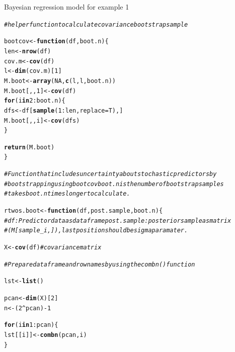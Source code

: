 \documentclass[11pt,a4paper,twoside]{book}\usepackage[]{graphicx}\usepackage[]{color}
\makeatletter
\newcommand{\hlnum}[1]{\textcolor[rgb]{0.686,0.059,0.569}{#1}}%
\newcommand{\hlcom}[1]{\textcolor[rgb]{0.678,0.584,0.686}{\textit{#1}}}%
\newcommand{\hlopt}[1]{\textcolor[rgb]{0,0,0}{#1}}%
\newcommand{\hlstd}[1]{\textcolor[rgb]{0.345,0.345,0.345}{#1}}%
\newcommand{\hlkwa}[1]{\textcolor[rgb]{0.161,0.373,0.58}{\textbf{#1}}}%
\newcommand{\hlkwb}[1]{\textcolor[rgb]{0.69,0.353,0.396}{#1}}%
\newcommand{\hlkwc}[1]{\textcolor[rgb]{0.333,0.667,0.333}{#1}}%
\newcommand{\hlkwd}[1]{\textcolor[rgb]{0.737,0.353,0.396}{\textbf{#1}}}%
\newenvironment{kframe}{%
 \def\at@end@of@kframe{}%
 \ifinner\ifhmode%
  \def\at@end@of@kframe{\end{minipage}}%
  \begin{minipage}{\columnwidth}%
 \fi\fi%
 \def\FrameCommand##1{\hskip\@totalleftmargin \hskip-\fboxsep
 \colorbox{shadecolor}{##1}\hskip-\fboxsep
     \hskip-\linewidth \hskip-\@totalleftmargin \hskip\columnwidth}%
 \MakeFramed {\advance\hsize-\width
   \@totalleftmargin\z@ \linewidth\hsize
   \@setminipage}}%
 {\par\unskip\endMakeFramed%
 \at@end@of@kframe}
\newenvironment{knitrout}{}{} %
\makeatother
\begin{document}
\begin{codeenv}
\caption{Bayesian regression model for example 1}\label{r03:LMG.boot}
\begin{knitrout}
\color{fgcolor}\begin{kframe}
\begin{alltt}
\hlcom{# helper function to calculate covariance bootstrap sample}

\hlstd{bootcov} \hlkwb{<-} \hlkwa{function}\hlstd{(}\hlkwc{df}\hlstd{,} \hlkwc{boot.n}\hlstd{) \{}
    \hlstd{len} \hlkwb{<-} \hlkwd{nrow}\hlstd{(df)}
    \hlstd{cov.m} \hlkwb{<-} \hlkwd{cov}\hlstd{(df)}
    \hlstd{l} \hlkwb{<-} \hlkwd{dim}\hlstd{(cov.m)[}\hlnum{1}\hlstd{]}
    \hlstd{M.boot} \hlkwb{<-} \hlkwd{array}\hlstd{(}\hlnum{NA}\hlstd{,} \hlkwd{c}\hlstd{(l, l, boot.n))}
    \hlstd{M.boot[, ,} \hlnum{1}\hlstd{]} \hlkwb{<-} \hlkwd{cov}\hlstd{(df)}
    \hlkwa{for} \hlstd{(i} \hlkwa{in} \hlnum{2}\hlopt{:}\hlstd{boot.n) \{}
        \hlstd{dfs} \hlkwb{<-} \hlstd{df[}\hlkwd{sample}\hlstd{(}\hlnum{1}\hlopt{:}\hlstd{len,} \hlkwc{replace} \hlstd{= T), ]}
        \hlstd{M.boot[, , i]} \hlkwb{<-} \hlkwd{cov}\hlstd{(dfs)}
    \hlstd{\}}

    \hlkwd{return}\hlstd{(M.boot)}
\hlstd{\}}


\hlcom{# Function that includes uncertainty about stochastic predictors by}
\hlcom{# bootstrapping using bootcov boot.n is the number of bootstrap samples}
\hlcom{# takes boot.n times longer to calculate.}

\hlstd{rtwos.boot} \hlkwb{<-} \hlkwa{function}\hlstd{(}\hlkwc{df}\hlstd{,} \hlkwc{post.sample}\hlstd{,} \hlkwc{boot.n}\hlstd{) \{}
    \hlcom{# df: Predictor data as data frame post.sample: posterior sample as matrix}
    \hlcom{# (M[sample_i,]), last position should be sigma paramater.}

    \hlstd{X} \hlkwb{<-} \hlkwd{cov}\hlstd{(df)}  \hlcom{#covariance matrix}

    \hlcom{# Prepare data frame and rownames by using the combn() function}

    \hlstd{lst} \hlkwb{<-} \hlkwd{list}\hlstd{()}

    \hlstd{pcan} \hlkwb{<-} \hlkwd{dim}\hlstd{(X)[}\hlnum{2}\hlstd{]}
    \hlstd{n} \hlkwb{<-} \hlstd{(}\hlnum{2}\hlopt{^}\hlstd{pcan)} \hlopt{-} \hlnum{1}

    \hlkwa{for} \hlstd{(i} \hlkwa{in} \hlnum{1}\hlopt{:}\hlstd{pcan) \{}
        \hlstd{lst[[i]]} \hlkwb{<-} \hlkwd{combn}\hlstd{(pcan, i)}
    \hlstd{\}}


\end{alltt}
\end{kframe}
\end{knitrout}
\end{codeenv}
\end{document}
